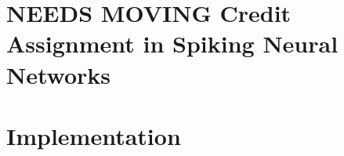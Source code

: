 \documentclass[journal,onecolumn,11pt]{IEEEtran}
\begin{document}


\section{NEEDS MOVING Credit Assignment in Spiking Neural Networks}
\label{sec:credit_assignment}

% 
%     






\section{Implementation}
\end{document}
